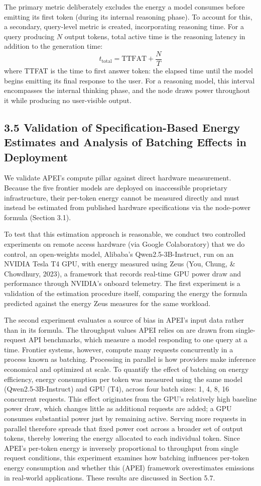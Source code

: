 \documentclass[11pt]{article}
\begin{document}
The primary metric deliberately excludes the energy a model consumes before emitting its first token (during its internal reasoning phase). To account for this, a secondary, query-level metric is created, incorporating reasoning time. For a query producing $N$ output tokens, total active time is the reasoning latency in addition to the generation time:
\[
t_{\text{total}} = \text{TTFAT} + \frac{N}{T}
\]
where TTFAT is the time to first answer token: the elapsed time until the model begins emitting its final response to the user. For a reasoning model, this interval encompasses the internal thinking phase, and the node draws power throughout it while producing no user-visible output.

\subsection*{3.5 Validation of Specification-Based Energy Estimates and Analysis of Batching Effects in Deployment}

We validate APEI's compute pillar against direct hardware measurement. Because the five frontier models are deployed on inaccessible proprietary infrastructure, their per-token energy cannot be measured directly and must instead be estimated from published hardware specifications via the node-power formula (Section 3.1).

To test that this estimation approach is reasonable, we conduct two controlled experiments on remote access hardware (via Google Colaboratory) that we do control, an open-weights model, Alibaba's Qwen2.5-3B-Instruct, run on an NVIDIA Tesla T4 GPU, with energy measured using Zeus (You, Chung, \& Chowdhury, 2023), a framework that records real-time GPU power draw and performance through NVIDIA's onboard telemetry. The first experiment is a validation of the estimation procedure itself, comparing the energy the formula predicted against the energy Zeus measures for the same workload.

The second experiment evaluates a source of bias in APEI's input data rather than in its formula. The throughput values APEI relies on are drawn from single-request API benchmarks, which measure a model responding to one query at a time. Frontier systems, however, compute many requests concurrently in a process known as batching. Processing in parallel is how providers make inference economical and optimized at scale. To quantify the effect of batching on energy efficiency, energy consumption per token was measured using the same model (Qwen2.5-3B-Instruct) and GPU (T4), across four batch sizes: 1, 4, 8, 16 concurrent requests. This effect originates from the GPU's relatively high baseline power draw, which changes little as additional requests are added; a GPU consumes substantial power just by remaining active. Serving more requests in parallel therefore spreads that fixed power cost across a broader set of output tokens, thereby lowering the energy allocated to each individual token. Since APEI's per-token energy is inversely proportional to throughput from single request conditions, this experiment examines how batching influences per-token energy consumption and whether this (APEI) framework overestimates emissions in real-world applications. These results are discussed in Section 5.7.
\end{document}
